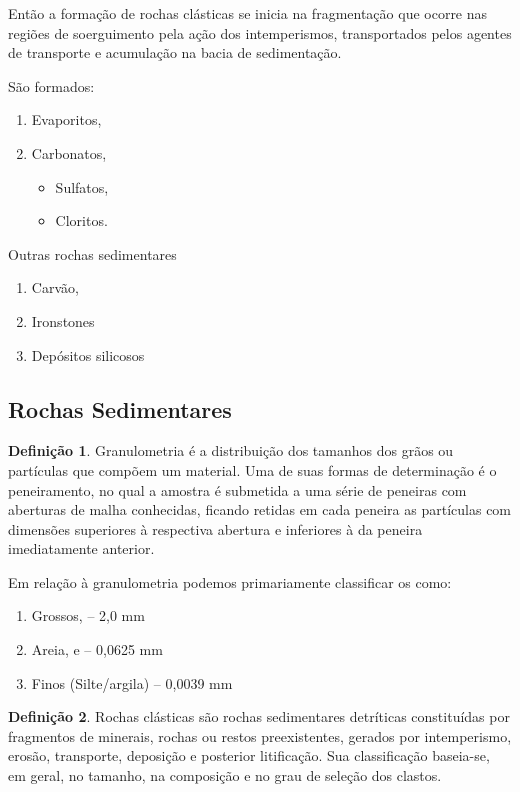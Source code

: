 \documentclass[a4paper,12pt]{article}
\theoremstyle{definition}
\theoremstyle{definition}
\theoremstyle{definition}
\newtheorem{definicao}{Definição}[section]
\begin{document}
Então a formação de rochas clásticas se inicia na fragmentação que ocorre nas regiões de soerguimento pela ação dos intemperismos, transportados pelos agentes de transporte e acumulação na bacia de sedimentação.

São formados:

\begin{enumerate}[label=\alph*.]
    \item Evaporitos,
    \item Carbonatos,
        \begin{itemize}
            \item Sulfatos,
            \item Cloritos.
        \end{itemize}
\end{enumerate}

Outras rochas sedimentares
\begin{enumerate}[label=\alph*.]
    \item Carvão,
    \item Ironstones
    \item Depósitos silicosos
\end{enumerate}

\subsection{Rochas Sedimentares}

\begin{definicao}

Granulometria é a distribuição dos tamanhos dos grãos ou partículas que compõem um material. Uma de suas formas de determinação é o peneiramento, no qual a amostra é submetida a uma série de peneiras com aberturas de malha conhecidas, ficando retidas em cada peneira as partículas com dimensões superiores à respectiva abertura e inferiores à da peneira imediatamente anterior.
    \end{definicao}
Em relação à granulometria podemos primariamente classificar os como:
\begin{enumerate}
    \item Grossos,
    -- 2,0 mm
    \item Areia, e
    -- 0,0625 mm
    \item Finos (Silte/argila)
    -- 0,0039 mm
\end{enumerate}

\begin{definicao}
Rochas clásticas são rochas sedimentares detríticas constituídas por fragmentos de minerais, rochas ou restos preexistentes, gerados por intemperismo, erosão, transporte, deposição e posterior litificação. Sua classificação baseia-se, em geral, no tamanho, na composição e no grau de seleção dos clastos.
\end{definicao}
\end{document}
